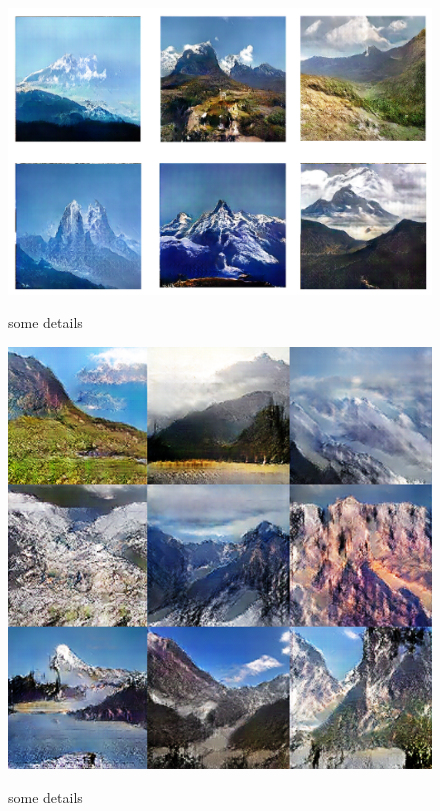 \documentclass{article}
\begin{document}
\begin{CJK*}{UTF8}{gbsn}
	\begin{figure}[htbp]
		\begin{minipage}{0.5\linewidth}
			\label{d1}
			\centering\includegraphics[scale=0.25]{res/mountain_detail.png}
			\caption{some details}
		\end{minipage}
		\begin{minipage}{0.5\linewidth}
			\label{d2}
			\centering\includegraphics[scale=0.35]{res/mountain_detail2.png}
			\caption{some details}
		\end{minipage}
	\end{figure}


\end{CJK*}
\end{document}
